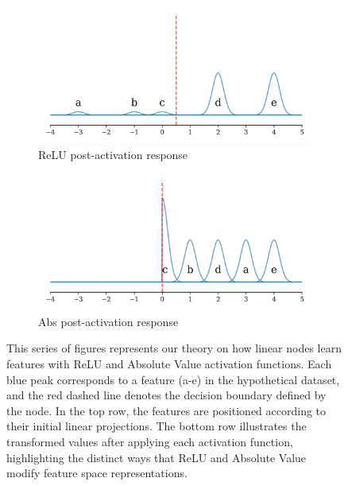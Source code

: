\begin{figure}[ht]
    \begin{subfigure}[b]{0.49\textwidth}
        \centering
        \includegraphics[width=\textwidth]{images/activation_demo_relu_post}
        \caption{ReLU post-activation response}
        \label{fig:relu_post}
    \end{subfigure}
    \hfill
    \begin{subfigure}[b]{0.49\textwidth}
        \centering
        \includegraphics[width=\textwidth]{images/activation_demo_abs_post}
        \caption{Abs post-activation response}
        \label{fig:abs_post}
    \end{subfigure}

    \caption{This series of figures represents our theory on how linear nodes learn features with ReLU and Absolute Value activation functions. Each blue peak corresponds to a feature (a-e) in the hypothetical dataset, and the red dashed line denotes the decision boundary defined by the node. In the top row, the features are positioned according to their initial linear projections. The bottom row illustrates the transformed values after applying each activation function, highlighting the distinct ways that ReLU and Absolute Value modify feature space representations.}
    \label{fig:activation_demo}
\end{figure}

